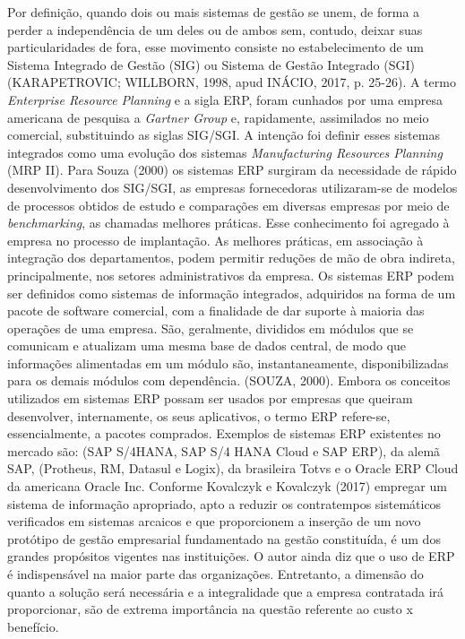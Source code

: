 Por definição, quando dois ou mais sistemas de gestão se unem, de forma a perder a independência de um deles ou de ambos sem, contudo, deixar suas particularidades de fora, esse movimento consiste no estabelecimento de um Sistema Integrado de Gestão (SIG) ou Sistema de Gestão Integrado (SGI) (KARAPETROVIC; WILLBORN, 1998, apud INÁCIO, 2017, p. 25-26).\newline
\indent A termo \textit{Enterprise Resource Planning} e a sigla ERP, foram cunhados por uma empresa americana de pesquisa a \textit{Gartner Group} e, rapidamente, assimilados no meio comercial, substituindo as siglas SIG/SGI.\newline
\indent A intenção foi definir esses sistemas integrados como uma evolução dos sistemas \textit{Manufacturing Resources Planning} (MRP II). Para Souza (2000) os sistemas ERP surgiram da necessidade de rápido desenvolvimento dos SIG/SGI, as empresas fornecedoras utilizaram-se de modelos de processos obtidos de estudo e comparações em diversas empresas por meio de \textit{benchmarking}, as chamadas melhores práticas. Esse conhecimento foi agregado à empresa no processo de implantação. As melhores práticas, em associação à integração dos departamentos, podem permitir reduções de mão de obra indireta, principalmente, nos setores administrativos da empresa.\newline
\indent Os sistemas ERP podem ser definidos como sistemas de informação integrados, adquiridos na forma de um pacote de software comercial, com a finalidade de dar suporte à maioria das operações de uma empresa. São, geralmente, divididos em módulos que se comunicam e atualizam uma mesma base de dados central, de modo que informações alimentadas em um módulo são, instantaneamente, disponibilizadas para os demais módulos com dependência. (SOUZA, 2000).\newline
\indent Embora os conceitos utilizados em sistemas ERP possam ser usados por empresas que queiram desenvolver, internamente, os seus aplicativos, o termo ERP refere-se, essencialmente, a pacotes comprados. Exemplos de sistemas ERP existentes no mercado são: (SAP S/4HANA, SAP S/4 HANA Cloud e SAP ERP), da alemã SAP, (Protheus, RM, Datasul e Logix), da brasileira Totvs e o Oracle ERP Cloud da americana Oracle Inc.\newline
\indent Conforme Kovalczyk e Kovalczyk (2017) empregar um sistema de informação apropriado, apto a reduzir os contratempos sistemáticos verificados em sistemas arcaicos e que proporcionem a inserção de um novo protótipo de gestão empresarial fundamentado na gestão constituída, é um dos grandes propósitos vigentes nas instituições. O autor ainda diz que o uso de ERP é indispensável na maior parte das organizações. Entretanto, a dimensão do quanto a solução será necessária e a integralidade que a empresa contratada irá proporcionar, são de extrema importância na questão referente ao custo x benefício.

